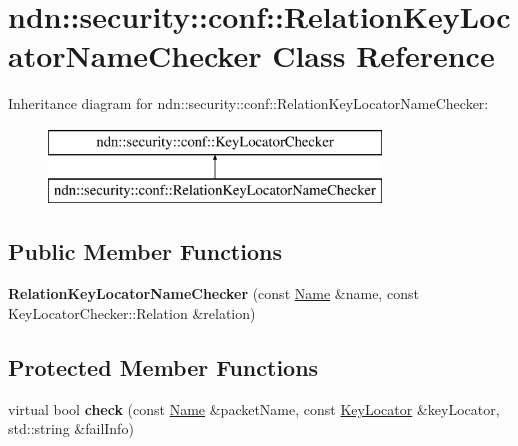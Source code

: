 \hypertarget{classndn_1_1security_1_1conf_1_1RelationKeyLocatorNameChecker}{}\section{ndn\+:\+:security\+:\+:conf\+:\+:Relation\+Key\+Locator\+Name\+Checker Class Reference}
\label{classndn_1_1security_1_1conf_1_1RelationKeyLocatorNameChecker}
Inheritance diagram for ndn\+:\+:security\+:\+:conf\+:\+:Relation\+Key\+Locator\+Name\+Checker\+:\begin{figure}[H]
\begin{center}
\leavevmode
\includegraphics[height=2.000000cm]{classndn_1_1security_1_1conf_1_1RelationKeyLocatorNameChecker}
\end{center}
\end{figure}
\subsection*{Public Member Functions}
\begin{DoxyCompactItemize}
\item 
{\bfseries Relation\+Key\+Locator\+Name\+Checker} (const \hyperlink{classndn_1_1Name}{Name} \&name, const Key\+Locator\+Checker\+::\+Relation \&relation)\hypertarget{classndn_1_1security_1_1conf_1_1RelationKeyLocatorNameChecker_af2a72f4c47303c0d342f3d2d417394f5}{}\label{classndn_1_1security_1_1conf_1_1RelationKeyLocatorNameChecker_af2a72f4c47303c0d342f3d2d417394f5}

\end{DoxyCompactItemize}
\subsection*{Protected Member Functions}
\begin{DoxyCompactItemize}
\item 
virtual bool {\bfseries check} (const \hyperlink{classndn_1_1Name}{Name} \&packet\+Name, const \hyperlink{classndn_1_1KeyLocator}{Key\+Locator} \&key\+Locator, std\+::string \&fail\+Info)\hypertarget{classndn_1_1security_1_1conf_1_1RelationKeyLocatorNameChecker_aad21dcbdf40b52e0017d9fcf46b94900}{}\label{classndn_1_1security_1_1conf_1_1RelationKeyLocatorNameChecker_aad21dcbdf40b52e0017d9fcf46b94900}

\end{DoxyCompactItemize}
